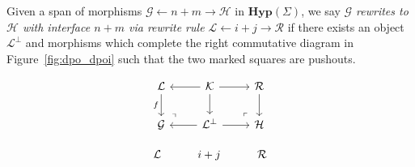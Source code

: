 \begin{definition}\label{def:dpoi}
Given a span of morphisms $\mathcal G \xleftarrow{} n+m \xrightarrow{} \mathcal H$ in $\textbf{Hyp}(\Sigma)$,  we say \textit{$\mathcal G$ rewrites to $\mathcal H$ with interface $n+m$ via rewrite rule $\mathcal L \xleftarrow{} i+j \xrightarrow{} \mathcal R$} if there exists an object $\mathcal{L}^{\bot}$ and morphisms which complete the right commutative diagram in Figure~\ref{fig:dpo_dpoi} such that the two marked squares are pushouts.
\begin{figure}[t!]
    \vspace{-0.5cm}
    \begin{subfigure}[T]{0.35\linewidth}
    \[
                \begin{tikzcd}
                    {\mathcal{L}} & {\mathcal{K}} & {\mathcal{R}} \\
                    {\mathcal{G}} & {\mathcal{L}^{\bot}} & {\mathcal{H}}
                    \arrow["f"', from=1-1, to=2-1]
                    \arrow[from=1-2, to=1-1]
                    \arrow[from=1-2, to=1-3]
                    \arrow[from=1-2, to=2-2]
                    \arrow[from=1-3, to=2-3]
                    \arrow["\lrcorner"{anchor=center, pos=0.125, rotate=90}, draw=none, from=2-1, to=1-2]
                    \arrow[from=2-2, to=2-1]
                    \arrow[from=2-2, to=2-3]
                    \arrow["\lrcorner"{anchor=center, pos=0.125, rotate=180}, draw=none, from=2-3, to=1-2]
                \end{tikzcd}
    \]
    \end{subfigure}
    \hfill
    \begin{subfigure}[T]{0.35\linewidth}
        \[
    \begin{tikzcd}
        {\mathcal{L}} & {i+j} & {\mathcal{R}} \\

\end{tikzcd}\]
\end{subfigure}
\end{figure}
\end{definition}
